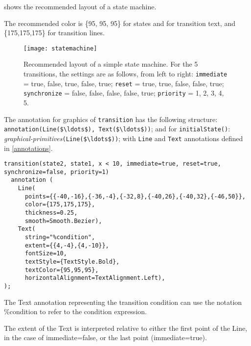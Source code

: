 \begin{nonnormative}
 shows the recommended layout of a state machine.

The recommended color is \{95, 95, 95\} for states and for transition text, and \{175,175,175\} for transition lines.
\end{nonnormative}

\begin{figure}[H]
  \begin{center}
    \texttt{[image: statemachine]}
  \end{center}
  \caption{Recommended layout of a simple state machine.  For the 5 transitions, the settings are as follows, from left to right: \lstinline!immediate! = true, false, true, false, true; \lstinline!reset! = true, true, false, false, true; \lstinline!synchronize! = false, false, false, false, true; \lstinline!priority! = 1, 2, 3, 4, 5.}
  \label{fig:state-machine-layout}
\end{figure}

The annotation for graphics of \lstinline!transition! has the following
structure: \lstinline!annotation(Line($\ldots$), Text($\ldots$))!; and for
\lstinline!initialState()!: \emph{graphical-primitives}\lstinline!(Line($\ldots$))!; with \lstinline!Line!
and \lstinline!Text! annotations defined in \cref{annotations}.

\begin{example}
\begin{lstlisting}[language=modelica]
transition(state2, state1, x < 10, immediate=true, reset=true, synchronize=false, priority=1)
  annotation (
    Line(
      points={{-40,-16},{-36,-4},{-32,8},{-40,26},{-40,32},{-46,50}},
      color={175,175,175},
      thickness=0.25,
      smooth=Smooth.Bezier),
    Text(
      string="%condition",
      extent={{4,-4},{4,-10}},
      fontSize=10,
      textStyle={TextStyle.Bold},
      textColor={95,95,95},
      horizontalAlignment=TextAlignment.Left),
);
\end{lstlisting}
\end{example}

The Text annotation representing the transition condition can use the
notation \%condition to refer to the condition expression.

The extent of the Text is interpreted relative to either the first point
of the Line, in the case of immediate=false, or the last point
(immediate=true).

